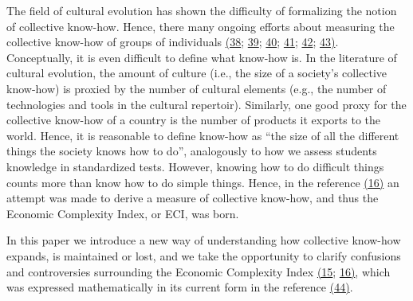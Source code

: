 \documentclass{pnastwo}
\begin{document}
\begin{article}
The field of cultural evolution has shown the difficulty of formalizing the notion of collective know-how. Hence, there many ongoing efforts about measuring the collective know-how of groups of individuals \hyperref[csl:38]{(38}; \hyperref[csl:39]{39}; \hyperref[csl:40]{40}; \hyperref[csl:41]{41}; \hyperref[csl:42]{42}; \hyperref[csl:43]{43)}. Conceptually, it is even difficult to define what know-how is. In the literature of cultural evolution, the amount of culture (i.e., the size of a society's collective know-how) is proxied by the number of cultural elements (e.g., the number of technologies and tools in the cultural repertoir). Similarly, one good proxy for the collective know-how of a country is the number of products it exports to the world. Hence, it is reasonable to define know-how as ``the size of all the different things the society knows how to do'', analogously to how we assess students knowledge in standardized tests. However, knowing how to do difficult things counts more than know how to do simple things. Hence, in the reference \hyperref[csl:16]{(16)} an attempt was made to derive a measure of collective know-how, and thus the Economic Complexity Index, or ECI, was born.

In this paper we introduce a new way of understanding how collective know-how expands, is maintained or lost, and we take the opportunity to clarify confusions and controversies surrounding the Economic Complexity Index \hyperref[csl:15]{(15}; \hyperref[csl:16]{16)}, which was expressed mathematically in its current form in the reference \hyperref[csl:44]{(44)}. 





\end{article}
\end{document}
